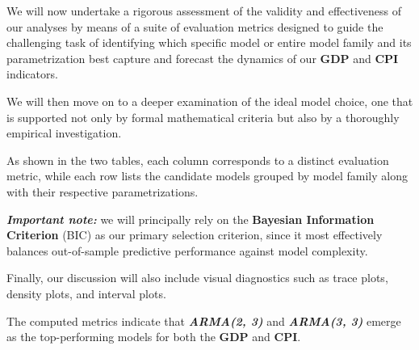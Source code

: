 \documentclass{Configuration_Files/PoliMi3i_thesis}
\begin{document}
We will now undertake a rigorous assessment of the validity and effectiveness of our analyses by means of a suite of evaluation metrics designed to guide the challenging task of identifying which specific model or entire model family and its parametrization best capture and forecast the dynamics of our \textbf{GDP} and \textbf{CPI} indicators.

We will then move on to a deeper examination of the ideal model choice, one that is supported not only by formal mathematical criteria but also by a thoroughly empirical investigation.


As shown in the two tables, each column corresponds to a distinct evaluation metric, while each row lists the candidate models grouped by model family along with their respective parametrizations.


\textbf{\textit{Important note:}} we will principally rely on the \textbf{Bayesian Information Criterion} (BIC) as our primary selection criterion, since it most effectively balances out-of-sample predictive performance against model complexity.

Finally, our discussion will also include visual diagnostics such as trace plots, density plots, and interval plots.

The computed metrics indicate that \textbf{\textit{ARMA(2, 3)}} and \textbf{\textit{ARMA(3, 3)}} emerge as the top-performing models for both the \textbf{GDP} and \textbf{CPI}.
\end{document}

